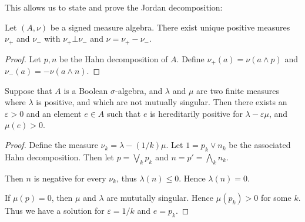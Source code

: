 \documentclass{owmaths}
\begin{document}
This allows us to state and prove the Jordan decomposition:
\begin{proposition}
    Let $(A,\nu)$ be a signed measure algebra. There exist unique positive
    measures $\nu_+$ and $\nu_-$ with $\nu_+\bot \nu_-$
    and $\nu = \nu_+-\nu_-$.
\end{proposition}
\begin{proof}
    Let $p,n$ be the Hahn decomposition of $A$. Define $\nu_+(a) = \nu(a\wedge p)$
    and $\nu_-(a) = -\nu(a\wedge n)$. 
    
\end{proof}

\begin{lemma}
    Suppose that $A$ is a Boolean $\sigma$-algebra, and $\lambda$ and $\mu$
    are two finite measures where $\lambda$ is positive, and which are not mutually singular. Then there
    exists an $\varepsilon > 0$ and an element $e \in A$ such that $e$
    is hereditarily positive for $\lambda-\varepsilon\mu$, and $\mu(e) > 0$.
\end{lemma}
\begin{proof}
    Define the measure $\nu_k = \lambda-(1/k)\mu$. Let $1 = p_k\vee n_k$
    be the associated Hahn decomposition. Then let $p = \bigvee_k p_k$
    and $n = p' = \bigwedge_k n_k$.
    
    Then $n$ is negative for every $\nu_k$, thus $\lambda(n) \leq 0$. Hence $\lambda(n) = 0$.
    
    If $\mu(p) = 0$, then $\mu$ and $\lambda$ are mututally singular.
    Hence $\mu(p_k) > 0$ for some $k$. Thus we have a solution
    for $\varepsilon = 1/k$ and $e = p_k$. 
\end{proof}
\end{document}
